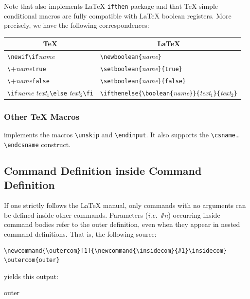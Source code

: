 Note that \hevea{} also implements \LaTeX{} \texttt{ifthen} package
and that \TeX{} simple conditional macros are fully compatible with
\LaTeX{} boolean registers. More precisely,
we have the following correspondences:
\begin{center}
\begin{tabular}{p{.3\linewidth}@{\quad}p{.4\linewidth}}
\multicolumn{1}{c}{\TeX} & \multicolumn{1}{c}{\LaTeX}\\[.5em]
\hline
\verb+\newif\if+\textit{name} & \verb+\newboolean{+\textit{name}\verb+}+\\[.5em]
\verb+\+\textit{name}\verb+true+ &
\verb+\setboolean{+\textit{name}\verb+}{true}+\\[.5em]
\verb+\+\textit{name}\verb+false+ &
\verb+\setboolean{+\textit{name}\verb+}{false}+\\[.5em]
\verb+\if+\textit{name} \textit{text$_1$}\verb+\else+
\textit{text$_2$}\verb+\fi+ &
\verb+\ifthenelse{\boolean{+\textit{name}\verb+}}{+\textit{text$_1$}\verb+}{+\textit{text$_2$}\verb+}+\\[.5em]
\end{tabular}
\end{center}

\subsubsection{Other \TeX{} Macros}
\hevea{} implements the macros \verb+\unskip+ and \verb+\endinput+.
It also supports the \verb+\csname+\ldots{} \verb+\endcsname+
construct.


\subsection{Command Definition inside Command Definition}
If one strictly follows the \LaTeX{} manual, only commands with no
arguments can be defined inside other commands.
Parameters (\emph{i.e.}\ \verb+#+\textit{n}) occurring inside command bodies
refer to the outer definition, even when they appear in nested
command definitions.
That is, the following source:
\begin{verbatim}
\newcommand{\outercom}[1]{\newcommand{\insidecom}{#1}\insidecom}
\outercom{outer}
\end{verbatim}
yields this output:
\begin{center}
\newcommand{\outercom}[1]{\newcommand{\insidecom}{#1}\insidecom}
\outercom{outer}
\end{center}

